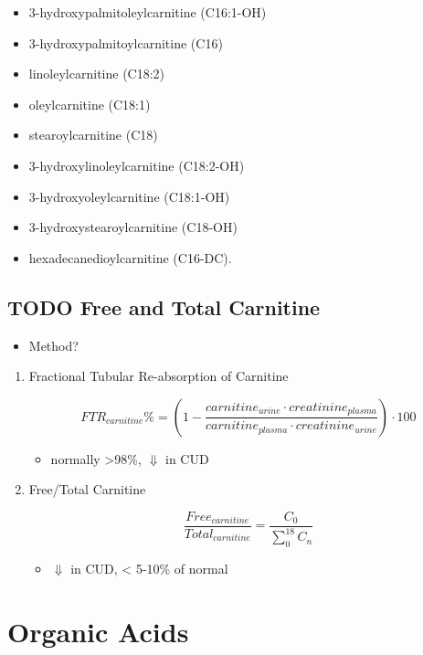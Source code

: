 \documentclass{scrartcl}
\begin{document}
\begin{enumerate}
\begin{itemize}
\item 3-hydroxypalmitoleylcarnitine (C16:1-OH)
\item 3-hydroxypalmitoylcarnitine (C16)
\item linoleylcarnitine (C18:2)
\item oleylcarnitine (C18:1)
\item stearoylcarnitine (C18)
\item 3-hydroxylinoleylcarnitine (C18:2-OH)
\item 3-hydroxyoleylcarnitine (C18:1-OH)
\item 3-hydroxystearoylcarnitine (C18-OH)
\item hexadecanedioylcarnitine (C16-DC).
\end{itemize}
\end{enumerate}


\subsection{{\bfseries\sffamily TODO} Free and Total Carnitine}
\label{sec:org99079f1}
\begin{itemize}
\item Method?
\end{itemize}
\begin{enumerate}
\item Fractional Tubular Re-absorption of Carnitine
\label{sec:orge49fe5b}

\begin{equation*}
FTR_{carnitine}\% = \left( 1 -  \frac{carnitine_{urine} \cdot creatinine_{plasma}}{carnitine_{plasma} \cdot creatinine_{urine}}\right) \cdot 100
\end{equation*}

\begin{itemize}
\item normally >98\%, \(\Downarrow\) in CUD
\end{itemize}

\item Free/Total Carnitine
\label{sec:orgcd9c37a}

\[
\frac{Free_{carnitine}}{Total_{carnitine}} = \frac{C_0}{\sum_{0}^{18} C_n}
\]

\begin{itemize}
\item \(\Downarrow\) in CUD, < 5-10\% of normal
\end{itemize}
\end{enumerate}
\section{Organic Acids}
\label{sec:orgd08cabe}
\end{document}

